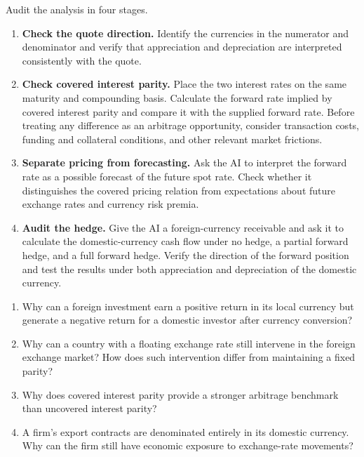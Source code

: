 Audit the analysis in four stages.

\begin{enumerate}

\item \textbf{Check the quote direction.} Identify the currencies in the numerator and denominator and verify that appreciation and depreciation are interpreted consistently with the quote.

\item \textbf{Check covered interest parity.} Place the two interest rates on the same maturity and compounding basis. Calculate the forward rate implied by covered interest parity and compare it with the supplied forward rate. Before treating any difference as an arbitrage opportunity, consider transaction costs, funding and collateral conditions, and other relevant market frictions.

\item \textbf{Separate pricing from forecasting.} Ask the AI to interpret the forward rate as a possible forecast of the future spot rate. Check whether it distinguishes the covered pricing relation from expectations about future exchange rates and currency risk premia.

\item \textbf{Audit the hedge.} Give the AI a foreign-currency receivable and ask it to calculate the domestic-currency cash flow under no hedge, a partial forward hedge, and a full forward hedge. Verify the direction of the forward position and test the results under both appreciation and depreciation of the domestic currency.

\end{enumerate}




\begin{enumerate}

\item Why can a foreign investment earn a positive return in its local currency but generate a negative return for a domestic investor after currency conversion?

\item Why can a country with a floating exchange rate still intervene in the foreign exchange market? How does such intervention differ from maintaining a fixed parity?

\item Why does covered interest parity provide a stronger arbitrage benchmark than uncovered interest parity?

\item A firm's export contracts are denominated entirely in its domestic currency. Why can the firm still have economic exposure to exchange-rate movements?

\end{enumerate}



